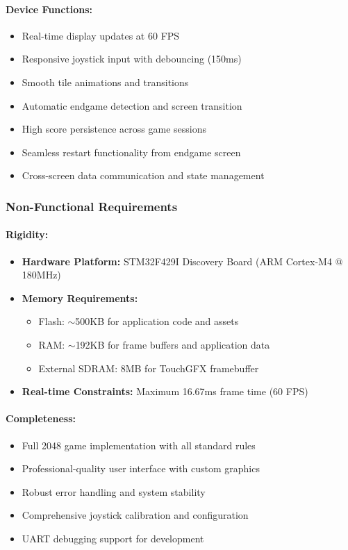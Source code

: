 \documentclass[12pt,a4paper]{article}
\begin{document}
\paragraph{Device Functions:}
\begin{itemize}[leftmargin=*]
    \item Real-time display updates at 60 FPS
    \item Responsive joystick input with debouncing (150ms)
    \item Smooth tile animations and transitions
    \item Automatic endgame detection and screen transition
    \item High score persistence across game sessions
    \item Seamless restart functionality from endgame screen
    \item Cross-screen data communication and state management
\end{itemize}

\subsubsection{Non-Functional Requirements}

\paragraph{Rigidity:}
\begin{itemize}[leftmargin=*]
    \item \textbf{Hardware Platform:} STM32F429I Discovery Board (ARM Cortex-M4 @ 180MHz)
    \item \textbf{Memory Requirements:}
    \begin{itemize}
        \item Flash: $\sim$500KB for application code and assets
        \item RAM: $\sim$192KB for frame buffers and application data
        \item External SDRAM: 8MB for TouchGFX framebuffer
    \end{itemize}
    \item \textbf{Real-time Constraints:} Maximum 16.67ms frame time (60 FPS)
\end{itemize}

\paragraph{Completeness:}
\begin{itemize}[leftmargin=*]
    \item Full 2048 game implementation with all standard rules
    \item Professional-quality user interface with custom graphics
    \item Robust error handling and system stability
    \item Comprehensive joystick calibration and configuration
    \item UART debugging support for development
\end{itemize}
\end{document}
